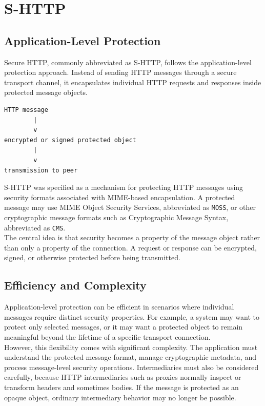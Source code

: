 \documentclass{scrbook}
\begin{document}
\section{S-HTTP}

\subsection{Application-Level Protection}

Secure HTTP, commonly abbreviated as S-HTTP, follows the application-level protection approach. Instead of sending HTTP messages through a secure transport channel, it encapsulates individual HTTP requests and responses inside protected message objects.

\begin{lstlisting}
HTTP message
        |
        v
encrypted or signed protected object
        |
        v
transmission to peer
\end{lstlisting}

S-HTTP was specified as a mechanism for protecting HTTP messages using security formats associated with MIME-based encapsulation. A protected message may use MIME Object Security Services, abbreviated as \texttt{MOSS}, or other cryptographic message formats such as Cryptographic Message Syntax, abbreviated as \texttt{CMS}.\\

The central idea is that security becomes a property of the message object rather than only a property of the connection. A request or response can be encrypted, signed, or otherwise protected before being transmitted.

\subsection{Efficiency and Complexity}

Application-level protection can be efficient in scenarios where individual messages require distinct security properties. For example, a system may want to protect only selected messages, or it may want a protected object to remain meaningful beyond the lifetime of a specific transport connection.\\

However, this flexibility comes with significant complexity. The application must understand the protected message format, manage cryptographic metadata, and process message-level security operations. Intermediaries must also be considered carefully, because HTTP intermediaries such as proxies normally inspect or transform headers and sometimes bodies. If the message is protected as an opaque object, ordinary intermediary behavior may no longer be possible.\\
\end{document}
